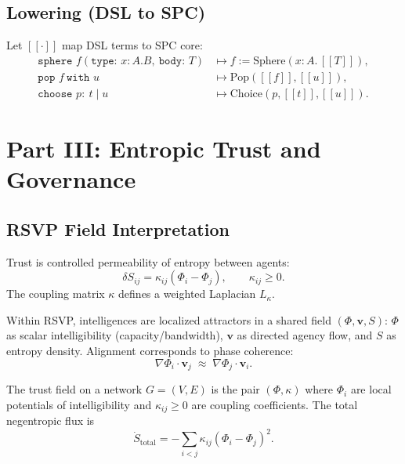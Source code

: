 \documentclass[12pt]{article}
\begin{document}
\subsection{Lowering (DSL to SPC)}
Let \([\![\cdot]\!]\) map DSL terms to SPC core:
\begin{align}
\texttt{sphere } f(\texttt{type: }x{:}A.B,\ \texttt{body: }T) &\mapsto f:=\mathrm{Sphere}(x{:}A.\,[\![T]\!]),\\
\texttt{pop } f\ \texttt{with } u &\mapsto \mathrm{Pop}([\![f]\!],[\![u]\!]),\\
\texttt{choose } p{:}\ t \mid u &\mapsto \mathrm{Choice}(p,[\![t]\!],[\![u]\!]).
\end{align}

\section*{Part III: Entropic Trust and Governance}

\subsection{RSVP Field Interpretation}
Trust is controlled permeability of entropy between agents:
\begin{equation}
\delta S_{ij}=\kappa_{ij}(\Phi_i-\Phi_j),\qquad \kappa_{ij}\ge 0.
\end{equation}
The coupling matrix \(\kappa\) defines a weighted Laplacian \(L_\kappa\).

Within RSVP, intelligences are localized attractors in a shared field \((\Phi,\mathbf{v},S)\): \(\Phi\) as scalar intelligibility (capacity/bandwidth), \(\mathbf{v}\) as directed agency flow, and \(S\) as entropy density. Alignment corresponds to phase coherence:
\begin{equation}
\nabla\Phi_i\cdot \mathbf{v}_j \;\approx\; \nabla\Phi_j\cdot \mathbf{v}_i.
\end{equation}

The trust field on a network \(G=(V,E)\) is the pair \((\Phi,\kappa)\) where \(\Phi_i\) are local potentials of intelligibility and \(\kappa_{ij}\ge0\) are coupling coefficients. The total negentropic flux is
\begin{equation}
\dot S_{\text{total}} = -\sum_{i<j}\kappa_{ij}(\Phi_i-\Phi_j)^2.
\end{equation}
\end{document}
